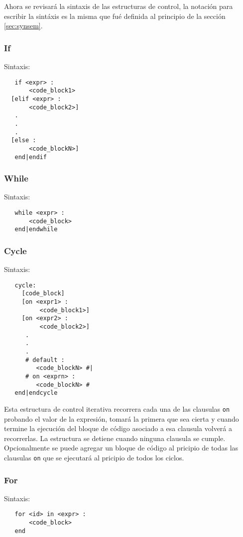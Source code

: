 \documentclass[12pt, spanish]{report}
\begin{document}
Ahora se revisar\'a la sintaxis de las estructuras de control, la
notaci\'on para escribir la sint\'axis es la misma que fu\'e definida al
principio de la secci\'on \ref{sec:synsem}.

\subsubsection{If}
Sintaxis:
\begin{verbatim}
   if <expr> :
       <code_block1>
  [elif <expr> :
       <code_block2>]
   .
   .
   .
  [else :
       <code_blockN>]
   end|endif
\end{verbatim}

\subsubsection{While}
Sintaxis:
\begin{verbatim}
   while <expr> :
       <code_block>
   end|endwhile
\end{verbatim}

\subsubsection{Cycle}
Sintaxis:
\begin{verbatim}
   cycle:
     [code_block]
     [on <expr1> :
          <code_block1>]
     [on <expr2> :
          <code_block2>]
      .
      .
      .
      # default :
         <code_blockN> #|
      # on <exprn> : 
         <code_blockN> #
   end|endcycle
\end{verbatim}

Esta estructura de control iterativa recorrera cada una de las
clausulas \texttt{on} probando el valor de la expresi\'on, tomar\'a la
primera que sea cierta y cuando termine la ejecuci\'on del bloque de
c\'odigo asociado a esa clausula volver\'a a recorrerlas. La
estructura se detiene cuando ninguna clausula se cumple. Opcionalmente
se puede agregar un bloque de c\'odigo al pricipio de todas las
clausulas \texttt{on} que se ejecutar\'a al pricipio de todos los
ciclos.

\subsubsection{For}
Sintaxis:
\begin{verbatim}
   for <id> in <expr> :
       <code_block>
   end
\end{verbatim}
\end{document}
